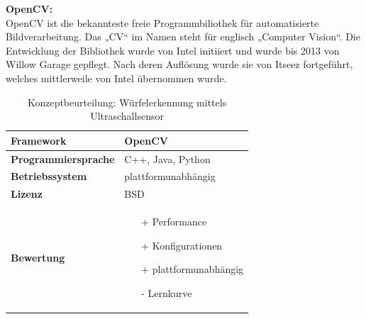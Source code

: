 \documentclass[../../../main.tex]{subfiles}
\begin{document}
        \textbf{OpenCV: }\\
        OpenCV ist die bekannteste freie Programmbiliothek für automatisierte Bildverarbeitung. Das „CV“ im Namen steht für englisch „Computer Vision“. Die Entwicklung der Bibliothek wurde von Intel initiiert und wurde bis 2013 von Willow Garage gepflegt. Nach deren Auflösung wurde sie von Itseez fortgeführt, welches mittlerweile von Intel übernommen wurde.
        \begin{flushleft}
            \begin{table}[h]
            \begin{tabular}{ | l | p{11cm} |}
            \hline
            \textbf{Framework} & OpenCV \\ \hline
            \textbf{Programmiersprache} & C++, Java, Python \\ \hline
            \textbf{Betriebssystem} & plattformunabhängig \\ \hline
            \textbf{Lizenz} & BSD \\ \hline
            \textbf{Bewertung} &  \begin{itemize}
                                    \item[+] Performance
                                    \item[+] Konfigurationen
                                    \item[+] plattformunabhängig 
                                    \item[-] Lernkurve
                                  \end{itemize} \\ \hline
            \end{tabular}
            \caption{Konzeptbeurteilung: Würfelerkennung mittels Ultraschallsensor}
            \label{tab:konzept_wurfel_ultraschall}
            \end{table}
        \end{flushleft}
        \vspace{0.5cm}
\end{document}
